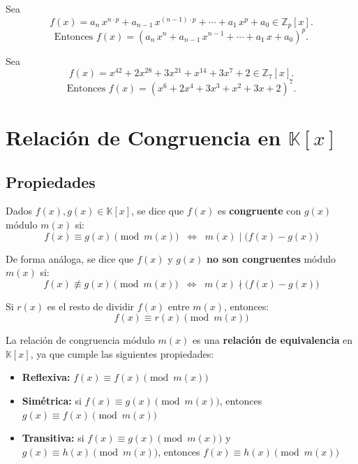 \documentclass[a4paper,12pt]{article}
\begin{document}
\begin{procedimiento}[title=Caso particular de factorización con exponente común en $\mathbb{Z}_p\text{[$x$]}$]
Sea
\[
f(x)=a_n\,x^{n\cdot p}+a_{n-1}\,x^{(n-1)\cdot p}+\cdots + a_1\,x^{p}+a_0 \in \mathbb{Z}_p[x].
\]
\[
\text{Entonces }
f(x) = 
(a_n\,x^{n}+a_{n-1}\,x^{n-1}+\cdots+a_1\,x+a_0)^p.
\]
\end{procedimiento}

\begin{ejemplo}[title=Ejemplo de reducción de exponentes]
Sea
\[
f(x)=x^{42}+2x^{28}+3x^{21}+x^{14}+3x^{7}+2 \in \mathbb{Z}_7[x].
\]
\[
\text{Entonces }
f(x) = (
x^{6}+2x^{4}+3x^{3}+x^{2}+3x+2)^7.
\]
\end{ejemplo}

\section{Relación de Congruencia en \(\mathbb{K}[x]\)}

\subsection{Propiedades}

\begin{procedimiento}[title=Definición de congruencia módulo \(m(x)\)]
Dados \(f(x), g(x) \in \mathbb{K}[x]\), se dice que \(f(x)\) es \textbf{congruente} con \(g(x)\) módulo \(m(x)\) si:
\[
f(x) \equiv g(x) \pmod{m(x)} \;\;\Longleftrightarrow\;\; m(x) \mid \big(f(x) - g(x)\big)
\]

De forma análoga, se dice que \(f(x)\) y \(g(x)\) \textbf{no son congruentes} módulo \(m(x)\) si:
\[
f(x) \not\equiv g(x) \pmod{m(x)} \;\;\Longleftrightarrow\;\; m(x) \nmid \big(f(x) - g(x)\big)
\]

Si \(r(x)\) es el resto de dividir \(f(x)\) entre \(m(x)\), entonces:
\[
f(x) \equiv r(x) \pmod{m(x)}
\]
\end{procedimiento}

\begin{procedimiento}[title=Relación de equivalencia]
La relación de congruencia módulo \(m(x)\) es una \textbf{relación de equivalencia} en \(\mathbb{K}[x]\), ya que cumple las siguientes propiedades:

\begin{itemize}
    \item \textbf{Reflexiva:} \(f(x) \equiv f(x) \pmod{m(x)}\)
    \item \textbf{Simétrica:} si \(f(x) \equiv g(x) \pmod{m(x)}\), entonces \(g(x) \equiv f(x) \pmod{m(x)}\)
    \item \textbf{Transitiva:} si \(f(x) \equiv g(x) \pmod{m(x)}\) y \(g(x) \equiv h(x) \pmod{m(x)}\), entonces \(f(x) \equiv h(x) \pmod{m(x)}\)
\end{itemize}
\end{procedimiento}
\end{document}
